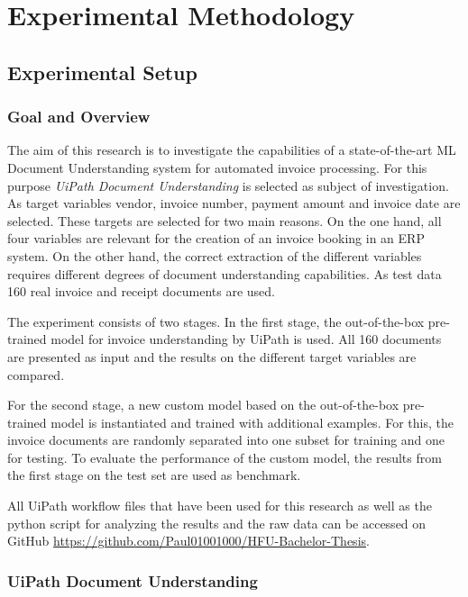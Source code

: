 \chapter{Experimental Methodology}

\section{Experimental Setup}
\subsection{Goal and Overview}
The aim of this research is to investigate the capabilities of a state-of-the-art \acl{ML} Document Understanding system for automated invoice processing. For this purpose \textit{UiPath Document Understanding} is selected as subject of investigation. As target variables vendor, invoice number, payment amount and invoice date are selected. These targets are selected for two main reasons. On the one hand, all four variables are relevant for the creation of an invoice booking in an ERP system. On the other hand, the correct extraction of the different variables requires different degrees of document understanding capabilities. As test data 160 real invoice and receipt documents are used.

The experiment consists of two stages. In the first stage, the out-of-the-box pre-trained model for invoice understanding by UiPath is used. All 160 documents are presented as input and the results on the different target variables are compared. 

For the second stage, a new custom model based on the out-of-the-box pre-trained model is instantiated and trained with additional examples. For this, the invoice documents are randomly separated into one subset for training and one for testing. To evaluate the performance of the custom model, the results from the first stage on the test set are used as benchmark. 

All UiPath workflow files that have been used for this research as well as the python script for analyzing the results and the raw data can be accessed on GitHub \url{https://github.com/Paul01001000/HFU-Bachelor-Thesis}.

\subsection{UiPath Document Understanding}

